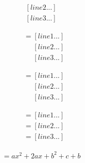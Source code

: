 \documentclass{article}
\begin{document}
% 
\begin{align}
    [line1...] \nonumber \\
    [line2...] \nonumber \\ 
    [line3...]  %
\end{align}




\begin{align}
    [left] &= [line1...] \nonumber \\ 
    &\mathrel{\phantom{=}} [line2...] \nonumber \\ 
    &\mathrel{\phantom{=}} [line3...]  %
\end{align}

\begin{align}
    [left] &= [line1...] \nonumber \\ 
    &\mathrel{\phantom{=}} [line2...] \nonumber \\ 
    &\mathrel{\phantom{=}} [line3...]  %
\end{align}


\begin{align}
    [left] &= [line1...] \nonumber \\
           &= [line2...] \nonumber \\ 
           &= [line3...]  %
\end{align}

\begin{align}
   = ax^2+2ax+b^2+c+b
\end{align}
\end{document}
